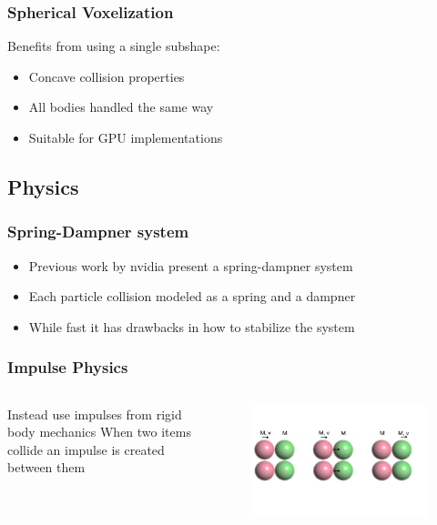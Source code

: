 \documentclass{beamer}
\begin{document}
	\begin{frame}
		\frametitle{Spherical Voxelization}
		Benefits from using a single subshape:
		\begin{itemize}
			\item Concave collision properties
			\item All bodies handled the same way
			\item Suitable for GPU implementations
		\end{itemize}
	\end{frame}

	\subsection{Physics}

	\begin{frame}
		\frametitle{Spring-Dampner system}
		\begin{itemize}
			\item Previous work by nvidia present a spring-dampner system
			\item Each particle collision modeled as a spring and a dampner
			\item While fast it has drawbacks in how to stabilize the system
		\end{itemize}
	\end{frame}
	\begin{frame}
		\frametitle{Impulse Physics}
		\begin{columns}[c] %
			Instead use impulses from rigid body mechanics
			When two items collide an impulse is created between them

			\begin{figure}
				\includegraphics[width=0.8\linewidth]{fig/ballsExpected.png}
			\end{figure}

		\end{columns}
	\end{frame}
\end{document}

